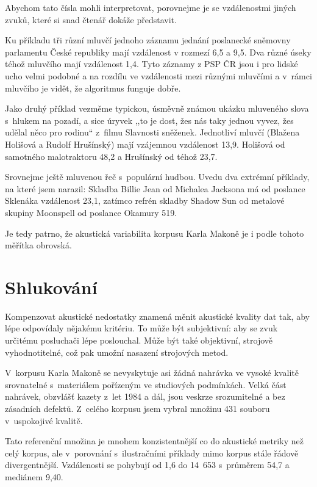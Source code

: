 Abychom tato čísla mohli interpretovat, porovnejme je se vzdálenostmi jiných
zvuků, které si snad čtenář dokáže představit.

Ku příkladu tři různí mluvčí jednoho záznamu jednání poslanecké sněmovny
parlamentu České republiky mají vzdálenost v rozmezí 6,5 a 9,5. Dva různé úseky
téhož mluvčího mají vzdálenost 1,4. Tyto záznamy z PSP ČR jsou i pro lidské ucho
velmi podobné a na rozdílu ve vzdálenosti mezi různými mluvčími a v~rámci
mluvčího je vidět, že algoritmus funguje dobře.

Jako druhý příklad vezměme typickou, úsměvně známou ukázku mluveného slova
s~hlukem na pozadí, a sice úryvek ,,to je dost, žes nás taky jednou vyvez, žes
udělal něco pro rodinu`` z~filmu Slavnosti sněženek. Jednotliví mluvčí (Blažena
Holišová a Rudolf Hrušínský) mají vzájemnou vzdálenost 13,9. Holišová od
samotného malotraktoru 48,2 a Hrušínský od téhož 23,7.

Srovnejme ještě mluvenou řeč s~populární hudbou. Uvedu dva extrémní příklady, na
které jsem narazil:
Skladba Billie Jean od Michalea Jacksona má od poslance Sklenáka vzdálenost
23,1, zatímco refrén skladby Shadow Sun od metalové skupiny Moonspell od
poslance Okamury 519.

Je tedy patrno, že akustická variabilita korpusu Karla Makoně je i podle tohoto
měřítka obrovská.

\section{Shlukování}

Kompenzovat akustické nedostatky znamená měnit akustické kvality dat tak, aby
lépe odpovídaly nějakému kritériu. To může být subjektivní: aby se zvuk určitému
posluchači lépe poslouchal. Může být také objektivní, strojově vyhodnotitelné,
což pak umožní nasazení strojových metod.

V~korpusu Karla Makoně se nevyskytuje asi žádná nahrávka ve vysoké kvalitě
srovnatelné s~materiálem pořízeným ve studiových podmínkách. Velká část
nahrávek, obzvlášť kazety z~let 1984 a dál, jsou veskrze srozumitelné a bez
zásadních defektů. Z~celého korpusu jsem vybral množinu 431 souboru v~uspokojivé
kvalitě.

Tato referenční množina je mnohem konzistentnější co do akustické metriky než
celý korpus, ale v~porovnání s~ilustračními příklady mimo korpus stále řádově
divergentnější. Vzdálenosti se pohybují od 1,6 do 14~653 s~průměrem  54,7 a
mediánem 9,40.

